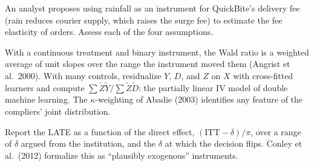\documentclass[11pt]{article}
\begin{document}
\begin{exercise}[judgment]
An analyst proposes using rainfall as an instrument for QuickBite's delivery fee (rain reduces courier supply, which raises the
surge fee) to estimate the fee elasticity of orders. Assess each of the four assumptions.
\end{exercise}

\sectionthree

\begin{extension}
With a continuous treatment and binary instrument, the Wald ratio is a weighted average of unit slopes over the range the instrument
moved them (Angrist et al.\ 2000). With many controls, residualize $Y$, $D$, and $Z$ on $X$ with cross-fitted learners and compute
$\sum\tilde Z\tilde Y/\sum\tilde Z\tilde D$: the partially linear IV model of double machine learning. The $\kappa$-weighting of Abadie (2003) identifies any feature of the
compliers' joint distribution.
\end{extension}

\begin{extension}
Report the LATE as a function of the direct effect, $(\text{ITT} - \delta)/\pi$, over a range of $\delta$ argued from the institution, and the
$\delta$ at which the decision flips. Conley et al.\ (2012) formalize this as ``plausibly exogenous'' instruments.
\end{extension}
\end{document}
